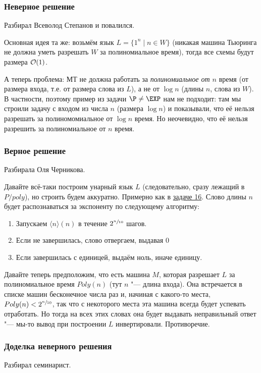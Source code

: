 	\subsubsection{Неверное решение}
		Разбирал Всеволод Степанов и повалился.

		Основная идея та же: возьмём язык $L=\{1^n \mid n \in W\}$ (никакая машина Тьюринга не должна уметь разрешать $W$ за полиномиальное время),
		тогда все схемы будут размера $\mathcal O(1)$.

		А теперь проблема: МТ не должна работать за \textit{полиномиальное от $n$} время (от размера входа,
		т.е. от размера слова из $L$), а не от $\log n$ (длины $n$, слова из $W$).
		В частности, поэтому пример из задачи $\P \neq \EXP$ нам не подходит:
		там мы строили задачу с входом из числа $n$ (размера $\log n$) и показывали,
		что её нельзя разрешать за полиномомиальное от $\log n$ время.
		Но неочевидно, что её нельзя разрешить за полиномиальное от $n$ время.

	\subsubsection{Верное решение}
		Разбирала Оля Черникова.

		Давайте всё-таки построим унарный язык $L$ (следовательно, сразу лежащий в $P/poly$), но строить будем аккуратно.
		Примерно как в \hyperref[prob16]{задаче 16}.
		Слово длины $n$ будет распознаваться за экспоненту по следующему алгоритму:
		\begin{enumerate}
			\item
				Запускаем $\langle n \rangle (n)$ в течение $2^{\sfrac n {10}}$ шагов.
			\item
				Если не завершилась, слово отвергаем, выдавая 0
			\item
				Если завершилась с единицей, выдаём ноль, иначе единицу.
		\end{enumerate}
		Давайте теперь предположим, что есть машина $M$, которая разрешает $L$ за полиномиальное время $Poly(n)$ (тут $n$ "--- длина входа).
		Она встречается в списке машин бесконечное числа раз и, начиная с какого-то места,
		$Poly(n) < 2^{\sfrac n {10}}$, так что с некоторого места эта машина всегда будет успевать отработать.
		Но тогда на всех этих словах она будет выдавать неправильный ответ "--- мы-то вывод при построении $L$ инвертировали.
		Противоречие.

	\subsubsection{Доделка неверного решения}
		Разбирал семинарист.

